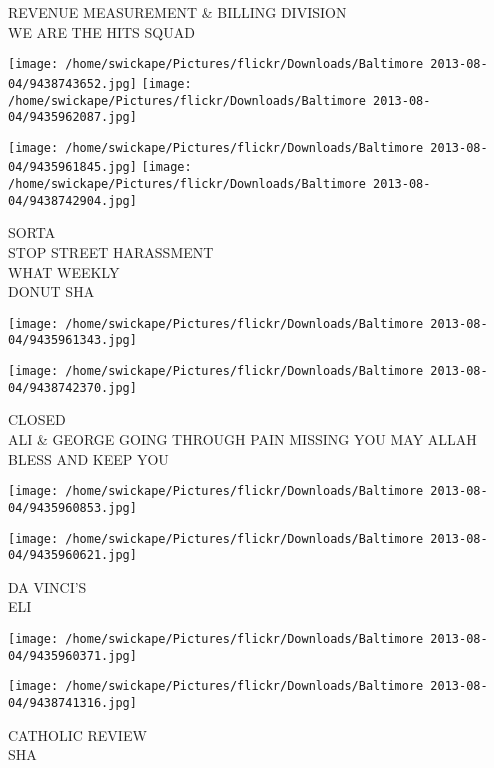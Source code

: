 \documentclass[10pt,letterpaper]{article}
\begin{document}
REVENUE MEASUREMENT \& BILLING DIVISION\\
WE ARE THE HITS SQUAD\\
\pagebreak

\texttt{[image: /home/swickape/Pictures/flickr/Downloads/Baltimore 2013-08-04/9438743652.jpg]}
\texttt{[image: /home/swickape/Pictures/flickr/Downloads/Baltimore 2013-08-04/9435962087.jpg]}

\texttt{[image: /home/swickape/Pictures/flickr/Downloads/Baltimore 2013-08-04/9435961845.jpg]}
\texttt{[image: /home/swickape/Pictures/flickr/Downloads/Baltimore 2013-08-04/9438742904.jpg]}

SORTA\\
STOP STREET HARASSMENT\\
WHAT WEEKLY\\
DONUT SHA\\
\pagebreak

\texttt{[image: /home/swickape/Pictures/flickr/Downloads/Baltimore 2013-08-04/9435961343.jpg]}

\vspace{0.25in}
\texttt{[image: /home/swickape/Pictures/flickr/Downloads/Baltimore 2013-08-04/9438742370.jpg]}

CLOSED\\
ALI \& GEORGE GOING THROUGH PAIN MISSING YOU MAY ALLAH BLESS AND KEEP YOU\\
\pagebreak

\texttt{[image: /home/swickape/Pictures/flickr/Downloads/Baltimore 2013-08-04/9435960853.jpg]}

\vspace{0.25in}
\texttt{[image: /home/swickape/Pictures/flickr/Downloads/Baltimore 2013-08-04/9435960621.jpg]}

DA VINCI'S\\
ELI\\
\pagebreak

\texttt{[image: /home/swickape/Pictures/flickr/Downloads/Baltimore 2013-08-04/9435960371.jpg]}

\vspace{0.25in}
\texttt{[image: /home/swickape/Pictures/flickr/Downloads/Baltimore 2013-08-04/9438741316.jpg]}

CATHOLIC REVIEW\\
SHA\\
\pagebreak
\end{document}

